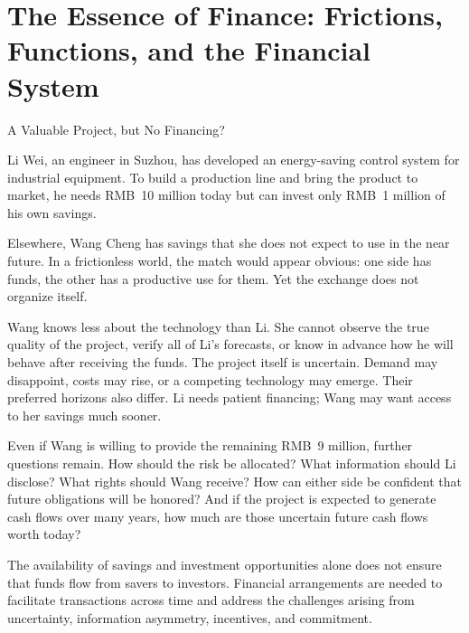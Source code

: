 \chapter{The Essence of Finance: Frictions, Functions, and the Financial System}
\label{chap:The_Essence_of_Finance_Frictions_Functions_and_the_Financial_System}

\begin{openingcase}{A Valuable Project, but No Financing?}

Li Wei, an engineer in Suzhou, has developed an energy-saving control system for industrial equipment. To build a production line and bring the product to market, he needs RMB~10 million today but can invest only RMB~1 million of his own savings.

Elsewhere, Wang Cheng has savings that she does not expect to use in the near future. In a frictionless world, the match would appear obvious: one side has funds, the other has a productive use for them. Yet the exchange does not organize itself.

Wang knows less about the technology than Li. She cannot observe the true quality of the project, verify all of Li's forecasts, or know in advance how he will behave after receiving the funds. The project itself is uncertain. Demand may disappoint, costs may rise, or a competing technology may emerge. Their preferred horizons also differ. Li needs patient financing; Wang may want access to her savings much sooner.

Even if Wang is willing to provide the remaining RMB~9 million, further questions remain. How should the risk be allocated? What information should Li disclose? What rights should Wang receive? How can either side be confident that future obligations will be honored? And if the project is expected to generate cash flows over many years, how much are those uncertain future cash flows worth today?

The availability of savings and investment opportunities alone does not ensure that funds flow from savers to investors. Financial arrangements are needed to facilitate transactions across time and address the challenges arising from uncertainty, information asymmetry, incentives, and commitment.

\end{openingcase}

